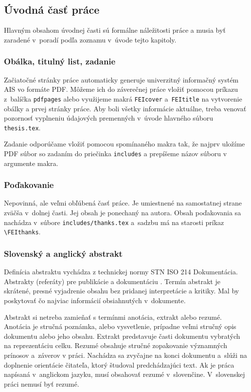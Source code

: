 \subsection{Úvodná časť práce}
Hlavným obsahom úvodnej časti sú formálne náležitosti práce a musia byť zaradené v~poradí podľa zoznamu v~úvode tejto kapitoly.

\subsubsection{Obálka, titulný list, zadanie}
Začiatočné stránky práce automaticky generuje univerzitný
informačný systém AIS vo formáte PDF.
Môžeme ich do záverečnej práce vložiť pomocou príkazu \verb|| z~balíčka \verb|pdfpages|
alebo využijeme makrá \verb|FEIcover| a~\verb|FEItitle| na vytvorenie obálky a prvej
stránky práce.
Aby boli všetky informácie aktuálne,
treba venovať pozornosť vyplneniu údajových
premenných v~úvode hlavného súboru \verb|thesis.tex|.

Zadanie odporúčame vložiť pomocou spomínaného makra
\verb|| tak, že najprv uložíme PDF súbor
so zadaním do priečinka \verb|includes| a prepíšeme
názov súboru v argumente makra.

\subsubsection{Poďakovanie}
Nepovinná, ale veľmi obľúbená časť práce.
Je umiestnené na samostatnej strane zväčša v~dolnej časti.
Jej obsah je ponechaný na autora.
Obsah poďakovania sa nachádza v~súbore
\verb|includes/thanks.tex| a~sadzbu má na starosti
príkaz \verb|\FEIthanks|.

\subsubsection{Slovenský a anglický abstrakt}
Definícia abstraktu vychádza z technickej normy STN ISO 214 Dokumentácia.
Abstrakty (referáty) pre publikácie a dokumentáciu \cite{iso214}.
Termín abstrakt je skrátené, presné vyjadrenie obsahu
bez pridanej interpretácie a kritiky.
Mal by poskytovať čo najviac informácií obsiahnutých v~dokumente.

Abstrakt si netreba zamieňať s termínmi anotácia,
extrakt alebo rezumé.
Anotácia je stručná poznámka, alebo vysvetlenie,
prípadne veľmi stručný opis dokumentu alebo jeho obsahu.
Extrakt predstavuje časti dokumentu vybratých
na reprezentáciu celku.
Rezumé obsahuje stručné zopakovanie významných prínosov
a~záverov v práci.
Nachádza sa zvyčajne na konci dokumentu
a~slúži na doplnenie orientácie čitateľa,
ktorý študoval predchádzajúci text.
Ak je práca napísaná v~anglickom jazyku,
musí obsahovať rezumé v~slovenčine.
V~slovenskej práci nemusí byť rezumé.

